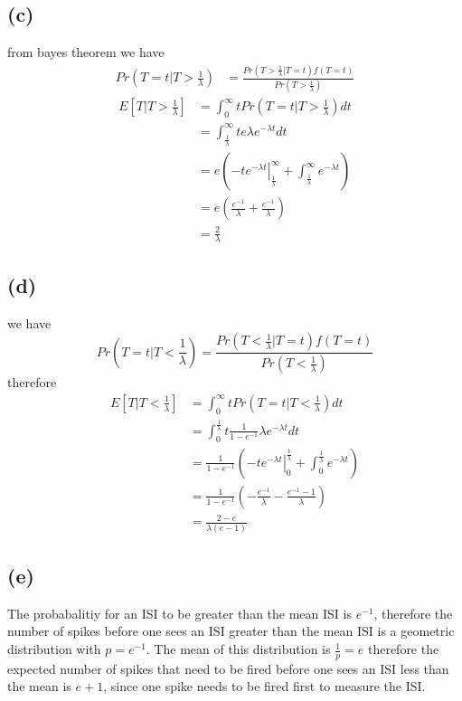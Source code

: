 \documentclass[12pt]{article}
\begin{document}
\subsection*{(c)}
from bayes theorem we have
\begin{align*}
    Pr\left(T=t|T>\frac{1}{\lambda}\right)&=\frac{Pr(T>\frac{1}{\lambda}|T=t)f(T=t)}{Pr(T>\frac{1}{\lambda})} 
\end{align*}
\begin{align*}
    E[T|T>\frac{1}{\lambda}]&=\int_{0}^{\infty}tPr\left(T=t|T>\frac{1}{\lambda}\right)dt\\
    &=\int_{\frac{1}{\lambda}}^{\infty}te \lambda e^{-\lambda t} dt\\
    &=e\left(\left. -te^{-\lambda t}\right|_{\frac{1}{\lambda}}^{\infty}+
    \int_{\frac{1}{\lambda}}^{\infty}e^{-\lambda t}\right)\\
    &=e\left(\frac{e^{-1}}{\lambda}+\frac{e^{-1}}{\lambda}\right)\\
    &=\boxed{\frac{2}{\lambda}}
\end{align*}

\subsection*{(d)}
we have
$$Pr\left(T=t|T<\frac{1}{\lambda}\right)=\frac{Pr(T<\frac{1}{\lambda}|T=t)f(T=t)}{Pr(T<\frac{1}{\lambda})}$$
therefore
\begin{align*}
    E\left[T|T<\frac{1}{\lambda}\right]&=\int_{0}^{\infty}tPr\left(T=t|T<\frac{1}{\lambda}\right)dt\\
    &=\int_{0}^{\frac{1}{\lambda}}t\frac{1}{1-e^{-1}} \lambda e^{-\lambda t} dt\\
    &=\frac{1}{1-e^{-1}}\left(\left. -te^{-\lambda t}\right|_{0}^{\frac{1}{\lambda}}+
    \int_{0}^{\frac{1}{\lambda}}e^{-\lambda t}\right)\\
    &=\frac{1}{1-e^{-1}}\left(-\frac{e^{-1}}{\lambda}-\frac{e^{-1}-1}{\lambda}\right)\\
    &=\boxed{\frac{2-e}{\lambda(e-1)}}
\end{align*}
\subsection*{(e)}
The probabalitiy for an ISI to be greater than the mean ISI is $e^{-1}$, therefore the 
number of spikes before one sees an ISI greater than the mean ISI is a geometric distribution
with $p=e^{-1}$. The mean of this distribution is $\frac{1}{p}=e$ therefore the expected number of spikes
that need to be fired before one sees an ISI less than the mean is $\boxed{e+1}$, since one spike needs to be fired first to measure the ISI.
\end{document}
